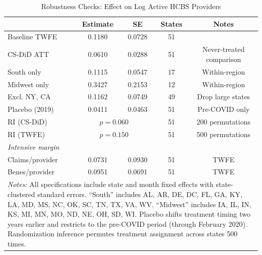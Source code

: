 \begin{table}[htbp]
\centering
\caption{Robustness Checks: Effect on Log Active HCBS Providers}
\label{tab:robustness}
\begin{tabular}{lcccc}
\hline\hline
 & Estimate & SE & States & Notes \\
\hline
Baseline TWFE & 0.1180 & 0.0728 & 51 & \\
CS-DiD ATT & 0.0610 & 0.0288 & 51 & Never-treated comparison \\
South only & 0.1115 & 0.0547 & 17 & Within-region \\
Midwest only & 0.3427 & 0.2153 & 12 & Within-region \\
Excl. NY, CA & 0.1162 & 0.0749 & 49 & Drop large states \\
Placebo (2019) & 0.0411 & 0.0463 & 51 & Pre-COVID only \\
RI (CS-DiD) & \multicolumn{2}{c}{$p = 0.060$} & 51 & 200 permutations \\
RI (TWFE) & \multicolumn{2}{c}{$p = 0.150$} & 51 & 500 permutations \\
\hline
\multicolumn{5}{l}{\textit{Intensive margin}} \\
Claims/provider & 0.0731 & 0.0930 & 51 & TWFE \\
Benes/provider & 0.0951 & 0.0691 & 51 & TWFE \\
\hline\hline
\multicolumn{5}{p{13cm}}{\footnotesize \textit{Notes:} All specifications include state and month fixed effects with state-clustered standard errors. ``South'' includes AL, AR, DE, DC, FL, GA, KY, LA, MD, MS, NC, OK, SC, TN, TX, VA, WV. ``Midwest'' includes IA, IL, IN, KS, MI, MN, MO, ND, NE, OH, SD, WI. Placebo shifts treatment timing two years earlier and restricts to the pre-COVID period (through February 2020). Randomization inference permutes treatment assignment across states 500 times.} \\
\end{tabular}
\end{table}

